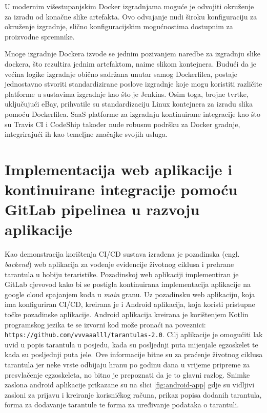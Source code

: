 \documentclass[a4paper,12pt,oneside]{article}
\begin{document}
U modernim višestupanjskim Docker izgradnjama moguće je odvojiti okruženje za izradu od konačne slike artefakta. Ovo odvajanje nudi široku konfiguraciju za okruženje izgradnje, slično konfiguracijskim mogućnostima dostupnim za proizvodne spremnike.

Mnoge izgradnje Dockera izvode se jednim pozivanjem naredbe za izgradnju slike dockera, što rezultira jednim artefaktom, naime slikom kontejnera. Budući da je većina logike izgradnje obično sadržana unutar samog Dockerfilea, postaje jednostavno stvoriti standardizirane poslove izgradnje koje mogu koristiti različite platforme u sustavima izgradnje kao što je Jenkins. Osim toga, brojne tvrtke, uključujući eBay, prihvatile su standardizaciju Linux kontejnera za izradu slika pomoću Dockerfilea. SaaS platforme za izgradnju kontinuirane integracije kao što su Travis CI i CodeShip također nude robusnu podršku za Docker gradnje, integrirajući ih kao temeljne značajke svojih usluga.

\newpage

\section{Implementacija web aplikacije i kontinuirane integracije pomoću GitLab pipelinea u razvoju aplikacije}

Kao demonstracija korištenja CI/CD sustava izrađena je pozadinska (engl. \textit{backend}) web aplikacija za vođenje evidencije životnog ciklusa i prehrane tarantula u hobiju teraristike. Pozadinskoj web aplikaciji implementiran je GitLab cjevovod kako bi se postigla kontinuirana implementacija aplikacije na google cloud spajanjem koda u \textit{main} granu. Uz pozadinsku web aplikaciju, koja ima konfiguriran CI/CD, kreirana je i Android aplikacija, koja koristi pristupne točke pozadinske aplikacije. Android aplikacija kreirana je korištenjem Kotlin programskog jezika te se izvorni kod može pronaći na poveznici: \texttt{https://github.com/vvvaaalll/tarantulas-2.0}.  Cilj aplikacije je omogućiti lak uvid u popis tarantula u posjedu, kada su posljednji puta mijenjale egzoskelet te kada su posljednji puta jele. Ove informacije bitne su za praćenje životnog ciklusa tarantula jer neke vrste odbijaju hranu po godinu dana u vrijeme pripreme za presvlačenje egzoskeleta, no bitno je prepoznati da je to glavni razlog. Snimke zaslona android aplikacije prikazane su na slici \ref{fig:android-app} gdje su vidljivi zasloni za prijavu i kreiranje korisničkog računa, prikaz popisa dodanih tarantula, forma za dodavanje tarantule te forma za uređivanje podataka o tarantuli.
\end{document}
